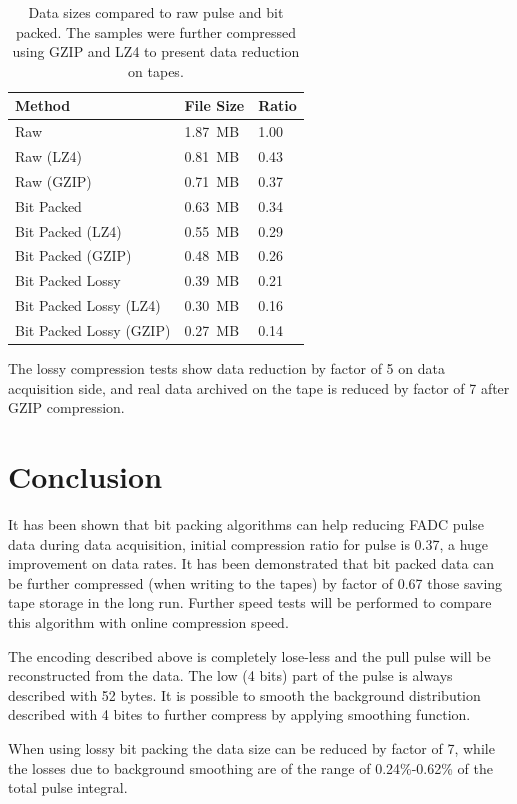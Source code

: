 \documentclass[12pt]{article}
\begin{document}
\begin{table}[!h]
\begin{center}
\begin{tabular}{  p{10cm} | p{2cm} | p{1.5cm} }
\hline 
Method & File Size & Ratio \\
\hline 
\hline 
Raw & 1.87~MB & 1.00 \\
Raw (LZ4) & 0.81~MB & 0.43 \\
Raw (GZIP) & 0.71~MB & 0.37 \\
\rowcolor{LightCyan}
Bit Packed &  0.63~MB & 0.34 \\
Bit Packed (LZ4) & 0.55~MB & 0.29 \\
\rowcolor{LightRose}
Bit Packed (GZIP) & 0.48~MB & 0.26 \\
Bit Packed Lossy  & 0.39~MB & 0.21 \\
Bit Packed Lossy  (LZ4) & 0.30~MB & 0.16 \\
\rowcolor{LightGreen}
Bit Packed Lossy (GZIP) & 0.27~MB & 0.14 \\
\hline
\end{tabular}
\caption{Data sizes compared to raw pulse and bit packed. The samples were further
compressed using GZIP and LZ4 to present data reduction on tapes.}
\end{center}
\end{table}

The lossy compression tests show data reduction by factor of 5 on data acquisition side,
and real data archived on the tape is reduced by factor of 7 after GZIP compression.


\section{Conclusion}

It has been shown that bit packing algorithms can help reducing FADC pulse data during data
acquisition, initial compression ratio for pulse is 0.37, a huge improvement on data rates. It has
been demonstrated that bit packed data can be further compressed (when writing to the tapes)
by factor of 0.67 those saving tape storage in the long run. Further speed tests will be performed 
to compare this algorithm with online compression speed.

The encoding described above is completely lose-less and the pull pulse will be reconstructed 
from the data. The low (4 bits) part of the pulse is always described with 52 bytes. It is possible
to smooth the background distribution described with 4 bites to further compress by applying 
smoothing function. 

When using lossy bit packing the data size can be reduced by factor of 7, while the losses due
to background smoothing are of the range of 0.24\%-0.62\% of the total pulse integral.
\end{document}
